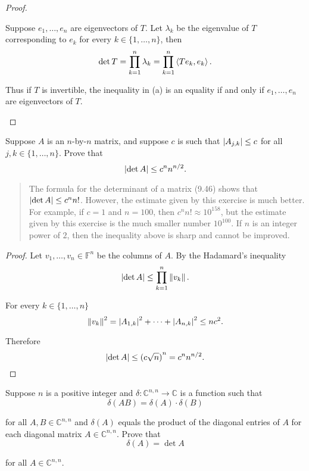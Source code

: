 \begin{proof}
\begin{enumerate}[label={(\alph*)}]
              Suppose $e_{1}, \ldots, e_{n}$ are eigenvectors of $T$. Let $\lambda_{k}$ be the eigenvalue of $T$ corresponding to $e_{k}$ for every $k\in\{1,\ldots,n\}$, then
              \[
                  \det T = \prod^{n}_{k=1}\lambda_{k} = \prod^{n}_{k=1}\left\langle{Te_{k}, e_{k}}\right\rangle.
              \]

              Thus if $T$ is invertible, the inequality in (a) is an equality if and only if $e_{1}, \ldots, e_{n}$ are eigenvectors of $T$.
    \end{enumerate}
\end{proof}
\newpage

\begin{exercise}\label{chapter9:sectionC:exercise20}
    Suppose $A$ is an $n$-by-$n$ matrix, and suppose $c$ is such that $\left\vert{A_{j,k}}\right\vert\leq c$ for all $j, k\in\{1,\ldots,n\}$. Prove that
    \[
        \left\vert{\det A}\right\vert\leq c^{n}n^{n/2}.
    \]
\end{exercise}

\begin{quote}
    The formula for the determinant of a matrix (9.46) shows that $\left\vert{\det A}\right\vert\leq c^{n}n{!}$. However, the estimate given by this exercise is much better. For example, if $c = 1$ and $n = 100$, then $c^{n}n! \approx 10^{158}$, but the estimate given by this exercise is the much smaller number $10^{100}$. If $n$ is an integer power of $2$, then the inequality above is sharp and cannot be improved.
\end{quote}

\begin{proof}
    Let $v_{1}, \ldots, v_{n}\in\mathbb{F}^{n}$ be the columns of $A$. By the Hadamard's inequality
    \[
        \left\vert{\det A}\right\vert\leq \prod^{n}_{k=1}\left\Vert{v_{k}}\right\Vert.
    \]

    For every $k\in\{1,\ldots,n\}$
    \[
        \left\Vert{v_{k}}\right\Vert^{2} = \left\vert{A_{1,k}}\right\vert^{2} + \cdots + \left\vert{A_{n,k}}\right\vert^{2} \leq nc^{2}.
    \]

    Therefore
    \[
        \left\vert{\det A}\right\vert\leq {(c\sqrt{n})}^{n} = c^{n}n^{n/2}.
    \]
\end{proof}
\newpage

\begin{exercise}\label{chapter9:sectionC:exercise21}
    Suppose $n$ is a positive integer and $\delta: \mathbb{C}^{n,n}\to \mathbb{C}$ is a function such that
    \[
        \delta(AB) = \delta(A)\cdot\delta(B)
    \]

    for all $A, B\in\mathbb{C}^{n,n}$ and $\delta(A)$ equals the product of the diagonal entries of $A$ for each diagonal matrix $A\in\mathbb{C}^{n,n}$. Prove that
    \[
        \delta(A) = \det A
    \]

    for all $A\in\mathbb{C}^{n,n}$.
\end{exercise}

